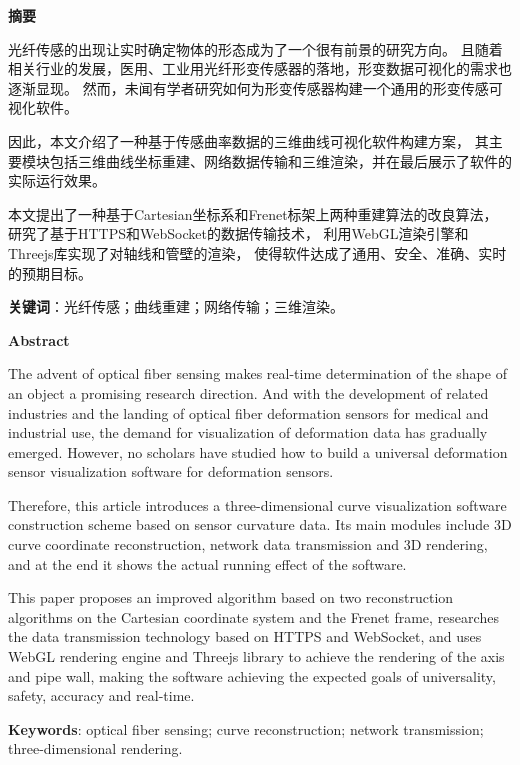 \clearpage
\begin{center}
    \bfseries {} 摘要
\end{center}

光纤传感的出现让实时确定物体的形态成为了一个很有前景的研究方向。
且随着相关行业的发展，医用、工业用光纤形变传感器的落地，形变数据可视化的需求也逐渐显现。
然而，未闻有学者研究如何为形变传感器构建一个通用的形变传感可视化软件。

因此，本文介绍了一种基于传感曲率数据的三维曲线可视化软件构建方案，
其主要模块包括三维曲线坐标重建、网络数据传输和三维渲染，并在最后展示了软件的实际运行效果。

本文提出了一种基于Cartesian坐标系和Frenet标架上两种重建算法的改良算法，
研究了基于HTTPS和WebSocket的数据传输技术，
利用WebGL渲染引擎和Threejs库实现了对轴线和管壁的渲染，
使得软件达成了通用、安全、准确、实时的预期目标。

\textbf{关键词}：光纤传感；曲线重建；网络传输；三维渲染。

\clearpage

\begin{center}
    \bfseries {} Abstract
\end{center}

The advent of optical fiber sensing makes real-time determination of the shape of an object a promising research direction.
And with the development of related industries and the landing of optical fiber deformation sensors for medical and industrial use, the demand for visualization of deformation data has gradually emerged.
However, no scholars have studied how to build a universal deformation sensor visualization software for deformation sensors.

Therefore, this article introduces a three-dimensional curve visualization software construction scheme based on sensor curvature data.
Its main modules include 3D curve coordinate reconstruction, network data transmission and 3D rendering, and at the end it shows the actual running effect of the software.

This paper proposes an improved algorithm based on two reconstruction algorithms on the Cartesian coordinate system and the Frenet frame, 
researches the data transmission technology based on HTTPS and WebSocket,
and uses WebGL rendering engine and Threejs library to achieve the rendering of the axis and pipe wall,
making the software achieving the expected goals of universality, safety, accuracy and real-time.

\textbf{Keywords}: optical fiber sensing; curve reconstruction; network transmission; three-dimensional rendering.